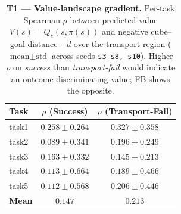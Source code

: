 \begin{table}[htbp]
\centering
\small
\caption{\textbf{T1 --- Value-landscape gradient.} Per-task Spearman
$\rho$ between predicted value $V(s)=Q_z(s,\pi(s))$ and negative
cube--goal distance $-d$ over the transport region
($\text{mean}\pm\text{std}$ across seeds \texttt{s3--s8, s10}).
Higher $\rho$ on \emph{success} than \emph{transport-fail} would
indicate an outcome-discriminating value; FB shows the opposite.}
\label{tab:T1_value_gradient}
\vspace{0.5em}
\begin{tabular}{lcc}
\toprule
\textbf{Task} & \textbf{$\rho$ (Success)} & \textbf{$\rho$ (Transport-Fail)} \\
\midrule
task1 & $0.258 \pm 0.264$ & $0.327 \pm 0.358$ \\
task2 & $0.089 \pm 0.341$ & $0.196 \pm 0.249$ \\
task3 & $0.163 \pm 0.332$ & $0.145 \pm 0.213$ \\
task4 & $0.113 \pm 0.664$ & $0.189 \pm 0.466$ \\
task5 & $0.112 \pm 0.568$ & $0.206 \pm 0.446$ \\
\midrule
\textbf{Mean} & $\mathbf{0.147}$ & $\mathbf{0.213}$ \\
\bottomrule
\end{tabular}
\end{table}
